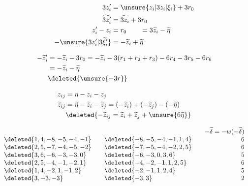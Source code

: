 
\deleted{%
\[
\begin{aligned}
\unsure{z|\zeta|\xi}'_i&=\deleted{\unsure{3\eta}}r_0+z_i\ \deleted{\unsure{=}}\\
\widetilde z'_i&=\widetilde r_0+\widetilde z_i=3r_0+\widetilde z_i\ \unsure{\Rightarrow}\quad \unsure{\zeta\longmapsto\lambda|\{1\longrightarrow\}\ \lambda|\{i\mapsto{}\}\ \lambda}\\
-\widetilde z'_i&=\unsure{-\widetilde z_i-\widetilde r_0=}
\end{aligned}
\]
}

\[
\begin{aligned}
3z'_i&=\unsure{z_i|3z_i|\xi_i}+3r_0\\
\widetilde{3z'_i}&=\widetilde{3z_i}+3r_0\\
z'_i-z_i&=r_0\qquad=3\widetilde z_i-\widetilde\eta\\
-\unsure{3z'_i|3\widetilde{\xi}'_i}&=-\widetilde z_i+\widetilde\eta
\end{aligned}
\]

\[
\begin{aligned}
-\widetilde z'_i&=-\widetilde z_i-3r_0
=-\widetilde z_i-3(r_1+r_2+r_3)-6r_4-3r_5-6r_6\\
&=-\widetilde z_i-\widetilde\eta\\
&\deleted{\unsure{-3r}}
\end{aligned}
\]

\[
\begin{aligned}
z_{ij}&=\eta-z_i-z_j\\
\widetilde z_{ij}&=\widetilde\eta-\widetilde z_i-\widetilde z_j
=(-\widetilde z_i)+(-\widetilde z_j)-(-\widetilde\eta)\\
&\deleted{-\widetilde z_{ij}=\widetilde z_i+\widetilde z_j+\unsure{6\widetilde\eta}}
\end{aligned}
\]


\[
\begin{array}{l@{\qquad}l@{\qquad}r}
&&-\widetilde\delta=-w(-\widetilde\delta)\\
\deleted{1,4,-8,-5,-4,-1}&\deleted{-8,-5,-4,-1,1,4}&6\\
\deleted{2,5,-7,-4,-5,-2}&\deleted{-7,-5,-4,-2,2,5}&6\\
\deleted{3,6,-6,-3,-3,0}&\deleted{-6,-3,0,3,6}&5\\
\deleted{2,5,-4,-1,-2,1}&\deleted{-4,-2,-1,1,2,5}&6\\
\deleted{1,4,-2,1,-1,2}&\deleted{-2,-1,1,2,4}&5\\
\deleted{3,-3,-3}&\deleted{-3,3}&2
\end{array}
\]

